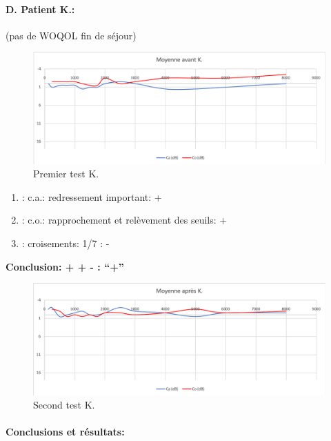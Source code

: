                 
\paragraph{D. Patient K.:}

  (pas de WOQOL fin de séjour)

        \begin{figure}
\centering
\includegraphics[width=0.7\linewidth]{images/graphiques/kad_pre.png}
\caption[Moyenne OG+OD]{Premier test K.}
       
\label{groupecontroleimage1}
\end{figure}
	\begin{enumerate}
 		
 		\item : c.a.: redressement important: +
                
 		\item : c.o.: rapprochement et relèvement des seuils: +
 		\item : croisements: 1/7 :  -
                  
                \end{enumerate}

                \textbf{  Conclusion:  + + -       : ``+''}

                 \begin{figure}
\centering
\includegraphics[width=0.7\linewidth]{images/graphiques/kad_post.png}
\caption[Moyenne OG+OD]{Second test K.}
       
\label{groupecontroleimage1}
\end{figure}
          
\paragraph{ Conclusions et résultats:}

